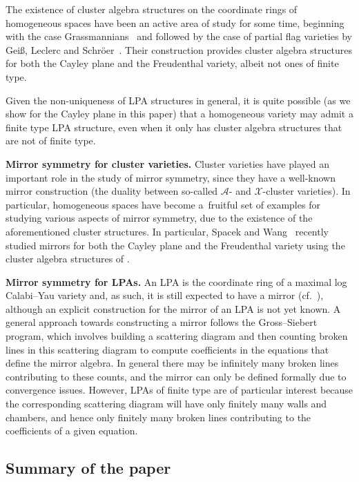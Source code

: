 \documentclass[10pt,a4paper]{amsart}
\numberwithin{equation}{section}
\theoremstyle{definition}
\begin{document}
The existence of cluster algebra structures on the coordinate rings of homogeneous spaces have been an active area of study for some time, beginning with the case Grassmannians~\cite{scott} and followed by the case of partial flag varieties by Gei{\ss}, Leclerc and Schr\"oer~\cite{GLS}. Their construction provides cluster algebra structures for both the Cayley plane and the Freudenthal variety, albeit not ones of finite type.

Given the non-uniqueness of LPA structures in general, it is quite possible (as we show for the Cayley plane in this paper) that a homogeneous variety may admit a finite type LPA structure, even when it only has cluster algebra structures that are not of finite type.

{\bf Mirror symmetry for cluster varieties.}
Cluster varieties have played an important role in the study of mirror symmetry, since they have a well-known mirror construction (the duality between so-called $\mathcal A$- and $\mathcal X$-cluster varieties). In particular, homogeneous spaces have become a~fruitful set of examples for studying various aspects of mirror symmetry, due to the existence of the aforementioned cluster structures. In particular, Spacek and Wang~\cite{Spacek-Wang} recently studied mirrors for both the Cayley plane and the Freudenthal variety using the cluster algebra structures of \cite{GLS}.

{\bf Mirror symmetry for LPAs.}
An LPA is the coordinate ring of a maximal log Calabi--Yau variety and, as such, it is still expected to have a mirror (cf.\ \cite[Conjecture 2.5]{duc}), although an explicit construction for the mirror of an LPA is not yet known. A general approach towards constructing a mirror follows the Gross--Siebert program, which involves building a scattering diagram and then counting broken lines in this scattering diagram to compute coefficients in the equations that define the mirror algebra. In general there may be infinitely many broken lines contributing to these counts, and the mirror can only be defined formally due to convergence issues. However, LPAs of finite type are of particular interest because the corresponding scattering diagram will have only finitely many walls and chambers, and hence only finitely many broken lines contributing to the coefficients of a given equation.

\subsection{Summary of the paper}
\end{document}
